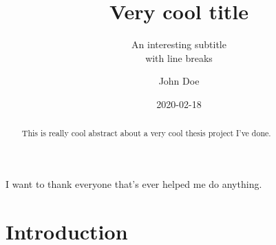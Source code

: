 

\usepackage{parskip}

\title{Very cool title}
\author{John Doe}
\date{2020-02-18}
\subtitle{An interesting subtitle \\with line breaks}








\maketitlepage{}

\begin{abstract}
  This is really cool abstract about a very cool thesis project I've done.
\end{abstract}

\begin{acknowledgements}
  I want to thank everyone that's ever helped me do anything.
\end{acknowledgements}

\makelists{}

\chapter{Introduction}

\lipsum[1-3]

